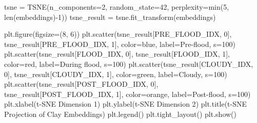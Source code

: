\documentclass[
  letterpaper,
  DIV=11,
  numbers=noendperiod]{scrreprt}
\newenvironment{Shaded}{\begin{snugshade}}{\end{snugshade}}
\newcommand{\BuiltInTok}[1]{\textcolor[rgb]{0.00,0.23,0.31}{#1}}
\newcommand{\DecValTok}[1]{\textcolor[rgb]{0.68,0.00,0.00}{#1}}
\newcommand{\NormalTok}[1]{\textcolor[rgb]{0.00,0.23,0.31}{#1}}
\newcommand{\OperatorTok}[1]{\textcolor[rgb]{0.37,0.37,0.37}{#1}}
\newcommand{\StringTok}[1]{\textcolor[rgb]{0.13,0.47,0.30}{#1}}
\begin{document}
\begin{Shaded}
\begin{Highlighting}[]
\NormalTok{tsne }\OperatorTok{=}\NormalTok{ TSNE(n\_components}\OperatorTok{=}\DecValTok{2}\NormalTok{, random\_state}\OperatorTok{=}\DecValTok{42}\NormalTok{, perplexity}\OperatorTok{=}\BuiltInTok{min}\NormalTok{(}\DecValTok{5}\NormalTok{, }\BuiltInTok{len}\NormalTok{(embeddings)}\OperatorTok{{-}}\DecValTok{1}\NormalTok{))}
\NormalTok{tsne\_result }\OperatorTok{=}\NormalTok{ tsne.fit\_transform(embeddings)}

\NormalTok{plt.figure(figsize}\OperatorTok{=}\NormalTok{(}\DecValTok{8}\NormalTok{, }\DecValTok{6}\NormalTok{))}
\NormalTok{plt.scatter(tsne\_result[PRE\_FLOOD\_IDX, }\DecValTok{0}\NormalTok{], tsne\_result[PRE\_FLOOD\_IDX, }\DecValTok{1}\NormalTok{], color}\OperatorTok{=}\StringTok{\textquotesingle{}blue\textquotesingle{}}\NormalTok{, label}\OperatorTok{=}\StringTok{\textquotesingle{}Pre{-}flood\textquotesingle{}}\NormalTok{, s}\OperatorTok{=}\DecValTok{100}\NormalTok{)}
\NormalTok{plt.scatter(tsne\_result[FLOOD\_IDX, }\DecValTok{0}\NormalTok{], tsne\_result[FLOOD\_IDX, }\DecValTok{1}\NormalTok{], color}\OperatorTok{=}\StringTok{\textquotesingle{}red\textquotesingle{}}\NormalTok{, label}\OperatorTok{=}\StringTok{\textquotesingle{}During flood\textquotesingle{}}\NormalTok{, s}\OperatorTok{=}\DecValTok{100}\NormalTok{)}
\NormalTok{plt.scatter(tsne\_result[CLOUDY\_IDX, }\DecValTok{0}\NormalTok{], tsne\_result[CLOUDY\_IDX, }\DecValTok{1}\NormalTok{], color}\OperatorTok{=}\StringTok{\textquotesingle{}green\textquotesingle{}}\NormalTok{, label}\OperatorTok{=}\StringTok{\textquotesingle{}Cloudy\textquotesingle{}}\NormalTok{, s}\OperatorTok{=}\DecValTok{100}\NormalTok{)}
\NormalTok{plt.scatter(tsne\_result[POST\_FLOOD\_IDX, }\DecValTok{0}\NormalTok{], tsne\_result[POST\_FLOOD\_IDX, }\DecValTok{1}\NormalTok{], color}\OperatorTok{=}\StringTok{\textquotesingle{}orange\textquotesingle{}}\NormalTok{, label}\OperatorTok{=}\StringTok{\textquotesingle{}Post{-}flood\textquotesingle{}}\NormalTok{, s}\OperatorTok{=}\DecValTok{100}\NormalTok{)}
\NormalTok{plt.xlabel(}\StringTok{\textquotesingle{}t{-}SNE Dimension 1\textquotesingle{}}\NormalTok{)}
\NormalTok{plt.ylabel(}\StringTok{\textquotesingle{}t{-}SNE Dimension 2\textquotesingle{}}\NormalTok{)}
\NormalTok{plt.title(}\StringTok{\textquotesingle{}t{-}SNE Projection of Clay Embeddings\textquotesingle{}}\NormalTok{)}
\NormalTok{plt.legend()}
\NormalTok{plt.tight\_layout()}
\NormalTok{plt.show()}
\end{Highlighting}
\end{Shaded}
\end{document}
